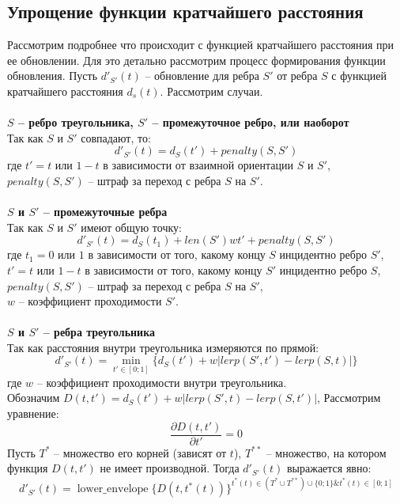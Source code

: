 \subsection{Упрощение функции кратчайшего расстояния}
Рассмотрим подробнее что происходит с функцией кратчайшего расстояния
при ее обновлении. Для это детально рассмотрим процесс формирования
функции обновления. Пусть $d'_{S'}(t)$ -- обновление для ребра $S'$ от ребра
$S$ с функцией кратчайшего расстояния $d_s(t)$. Рассмотрим случаи.
\\
\\
\textbf{$S$ -- ребро треугольника, $S'$ -- промежуточное ребро, или наоборот}\\
Так как $S$ и $S'$ совпадают, то:
\begin{equation} \label{eq:itd}
d'_{S'}(t) = d_S(t') + penalty(S, S')
\end{equation}
где $t' = t$ или $1 - t$ в зависимости от взаимной ориентации $S$ и $S'$,\\
$penalty(S, S')$ -- штраф за переход с ребра $S$ на $S'$.
\\
\\
\textbf{$S$ и $S'$ -- промежуточные ребра}\\
Так как $S$ и $S'$ имеют общую точку:
\begin{equation} \label{eq:iid}
d'_{S'}(t) = d_S(t_1) + len(S')wt' + penalty(S, S')
\end{equation}
где $t_1 = 0$ или $1$ в зависимости от того, какому концу $S$
инцидентно ребро  $S'$,\\
$t' = t$ или $1 - t$ в зависимости от того, какому концу $S'$
инцидентно ребро $S$,\\
$penalty(S, S')$ -- штраф за переход с ребра $S$ на $S'$,\\
$w$ -- коэффициент проходимости $S'$.
\\
\\
\textbf{$S$ и $S'$ -- ребра треугольника}\\
Так как расстояния внутри треугольника измеряются по прямой:
\begin{equation} \label{eq:ttd}
d'_{S'}(t) = \min_{t' \in [0; 1]}\{d_S(t') + w|lerp(S', t') - lerp(S, t)|\}
\end{equation}
где $w$ -- коэффициент проходимости внутри треугольника.\\
Обозначим $D(t, t') = d_S(t') + w|lerp(S', t) - lerp(S, t')|$,
Рассмотрим уравнение:
\begin{equation} \label{eq:ttder}
\frac{\partial D(t, t')}{\partial t'} = 0
\end{equation}
Пусть $T^*$ -- множество его корней (зависят от $t$), $T^{**}$ -- множество, на котором
функция $D(t, t')$ не имеет производной. Тогда $d'_{S'}(t)$ выражается явно:
\begin{equation} \label{eq:ttd2}
d'_{S'}(t) = \mathop{lower\_envelope}
  \{D(t, t^*(t))\}^{t^*(t) \in (T^* \cup T^{**}) \cup \{0; 1\} \& t^*(t) \in [0;1] }
\end{equation}


